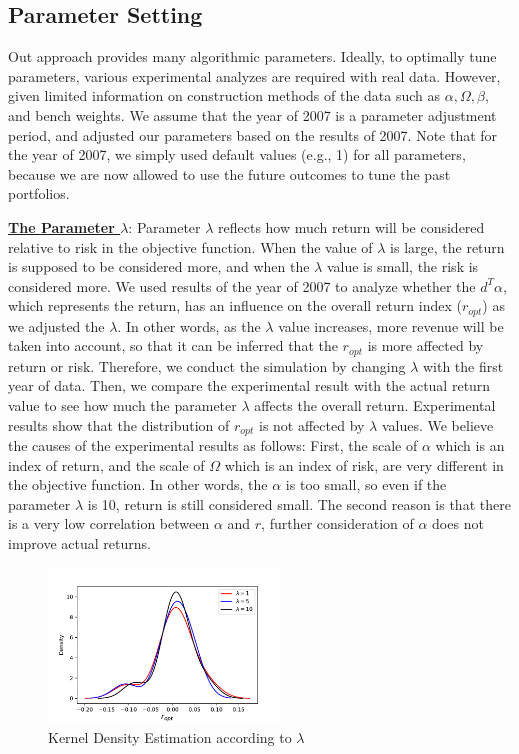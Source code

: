 \documentclass[11pt]{article}
\begin{document}
	
	
	
	\subsection{Parameter Setting}
	Out approach provides many algorithmic parameters. Ideally, to optimally tune parameters, various experimental analyzes are required with real data. However, given limited information on construction methods of the data such as $\alpha, \Omega, \beta$, and bench weights. We assume that the year of 2007 is a parameter adjustment period, and adjusted our parameters based on the results of 2007. Note that for the year of 2007, we simply used default values (e.g., 1) for all parameters, because we are now allowed to use the future outcomes to tune the past portfolios. 
	
	\underline{\textbf{The Parameter $\lambda$}}: Parameter $ \lambda $ reflects how much return will be considered relative to risk in the objective function. When the value of $ \lambda $ is large, the return is supposed to be considered more, and when the $\lambda$ value is small, the risk is considered more. We used results of the year of 2007 to analyze whether the $d^{T} \alpha$, which represents the return, has an influence on the overall return index ($r_{opt}$) as we adjusted the $\lambda$. In other words, as the $\lambda$ value increases, more revenue will be taken into account, so that it can be inferred that the $r_{opt}$  is more affected by return or risk. Therefore, we conduct the simulation by changing $ \lambda $ with the first year of data. Then, we compare the experimental result with the actual return value to see how much the parameter $ \lambda $ affects the overall return. Experimental results show that the distribution of $r_{opt}$  is not affected by $\lambda$ values. We believe the causes of the experimental results as follows: First, the scale of $\alpha$ which is an index of return, and the scale of $\Omega$ which is an index of risk, are very different in the objective function. In other words, the $\alpha$ is too small, so even if the parameter $\lambda$ is 10, return is still considered small. The second reason is that there is a very low correlation between $\alpha$ and $r$, further consideration of $\alpha$ does not improve actual returns. 
	\begin{figure}[h] 
		\begin{center}
			\includegraphics[width=0.55\textwidth]{lambda}
			\caption{ Kernel Density Estimation according to $\lambda$ } \label{fig:lambda}
		\end{center}
	\end{figure}
	
\end{document}
